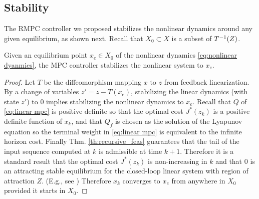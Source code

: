 \subsection{Stability}
\label{[sec:stability]}
The RMPC controller we proposed stabilizes the nonlinear dynamics around any given equilibrium, as shown next. 
Recall that $X_0 \subset X$ is a subset of $T^{-1}(Z)$.
\begin{theorem}[Stability]
Given an equilibrium point $x_e \in X_0$ of the nonlinear dynamics \eqref{eq:nonlinear dyanmics}, the MPC controller stabilizes the nonlinear system to $x_e$.
\end{theorem}

\begin{proof}
Let $T$ be the diffeomorphism mapping $x$ to $z$ from feedback linearization.
By a change of variables $z' = z - T(x_e)$, stabilizing the linear dynamics (with state $z'$) to 0 implies stabilizing the nonlinear dynamics to $x_e$.
Recall that $Q$ of \eqref{eq:linear mpc} is positive definite so that the optimal cost $J^*(z_k)$ is a positive definite function of $x_k$, and that $Q_f$ is chosen as the solution of the Lyapunov equation so the terminal weight in \eqref{eq:linear mpc} is equivalent to the infinite horizon cost. 
Finally Thm.  \ref{th:recursive_feas} guarantees that the tail of the input sequence computed at $k$ is admissible at time $k+1$. 
Therefore it is a standard result that the optimal cost $J^{*}(z_k)$ is non-increasing in $k$ and that $0$ is an attracting stable equilibrium for the closed-loop linear system with region of attraction $Z$. (E.g., see \cite{CannonK15MPC} )
Therefore $x_k$ converges to $x_e$ from anywhere in $X_0$ provided it starts in $X_0$.
\end{proof}